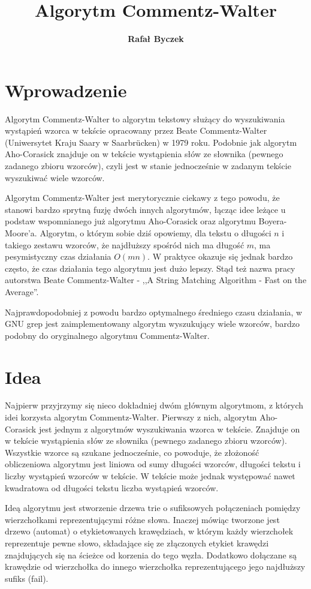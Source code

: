 \documentclass[a4paper,11pt]{article}
\title{\textbf{Algorytm Commentz-Walter}}
\author{\textbf{Rafał Byczek}}
\date{}
\begin{document}
\maketitle

\section{Wprowadzenie}
Algorytm Commentz-Walter to algorytm tekstowy służący do wyszukiwania wystąpień wzorca w tekście opracowany przez Beate Commentz-Walter (Uniwersytet Kraju Saary w Saarbrücken) w 1979 roku. Podobnie jak algorytm Aho-Corasick znajduje on w tekście wystąpienia słów ze słownika (pewnego zadanego zbioru wzorców), czyli jest w stanie jednocześnie w zadanym tekście wyszukiwać wiele wzorców. 

Algorytm Commentz-Walter jest merytorycznie ciekawy z tego powodu, że stanowi bardzo sprytną fuzję dwóch innych algorytmów, łącząc idee leżące u podstaw wspomnianego już algorytmu Aho-Corasick oraz algorytmu Boyera-Moore'a. Algorytm, o którym sobie dziś opowiemy, dla tekstu o długości $n$ i takiego zestawu wzorców, że najdłuższy spośród nich ma długość $m$, ma pesymistyczny czas działania $O(mn)$. W praktyce okazuje się jednak bardzo często, że czas działania tego algorytmu jest dużo lepszy. Stąd też nazwa pracy autorstwa Beate Commentz-Walter - ,,A String Matching Algorithm - Fast on the Average''. 

Najprawdopodobniej z powodu bardzo optymalnego średniego czasu działania, w GNU grep jest zaimplementowany algorytm wyszukujący wiele wzorców, bardzo podobny do oryginalnego algorytmu Commentz-Walter.

\section{Idea}
Najpierw przyjrzymy się nieco dokładniej dwóm głównym algorytmom, z których idei korzysta algorytm Commentz-Walter. Pierwszy z nich, algorytm Aho-Corasick jest jednym z algorytmów wyszukiwania wzorca w tekście. Znajduje on w tekście wystąpienia słów ze słownika (pewnego zadanego zbioru wzorców). Wszystkie wzorce są szukane jednocześnie, co powoduje, że złożoność obliczeniowa algorytmu jest liniowa od sumy długości wzorców, długości tekstu i liczby wystąpień wzorców w tekście. W tekście może jednak występować nawet kwadratowa od długości tekstu liczba wystąpień wzorców. 

Ideą algorytmu jest stworzenie drzewa trie o sufiksowych połączeniach pomiędzy wierzchołkami reprezentującymi różne słowa. Inaczej mówiąc tworzone jest drzewo (automat) o etykietowanych krawędziach, w którym każdy wierzchołek reprezentuje pewne słowo, składające się ze złączonych etykiet krawędzi znajdujących się na ścieżce od korzenia do tego węzła. Dodatkowo dołączane są krawędzie od wierzchołka do innego wierzchołka reprezentującego jego najdłuższy sufiks (fail). 
\end{document}
